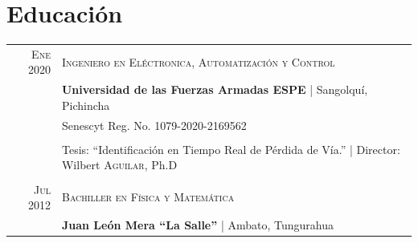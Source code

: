 \documentclass[a4paper,10.9pt]{article}
\begin{document}
\section{Educación}
\begin{tabular}{r|l}	
 \textsc{Ene} 2020&  \textsc{Ingeniero en Eléctronica, Automatización y Control}\\&
 \textbf{Universidad de las Fuerzas Armadas ESPE} | Sangolquí, Pichincha\\
&Senescyt Reg. No. 1079-2020-2169562\\
\\
& Tesis: ``Identificación en Tiempo Real de Pérdida de Vía.'' | \small Director: Wilbert \textsc{Aguilar}, Ph.D\\
\multicolumn{2}{c}{} \\
 \textsc{Jul} 2012 &  \textsc{Bachiller en Física y Matemática}\\&
 \textbf{Juan León Mera “La Salle”} | Ambato, Tungurahua\\
\end{tabular}

\end{document}
